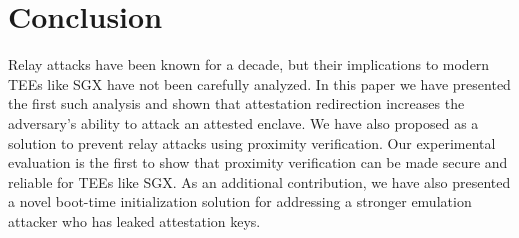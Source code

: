 
\section{Conclusion}
\label{sec:conclusion}

Relay attacks have been known for a decade, but their implications to modern TEEs like SGX have not been carefully analyzed. In this paper we have presented the first such analysis and shown that attestation redirection increases the adversary's ability to attack an attested enclave. We have also proposed \name as a solution to prevent relay attacks using proximity verification. Our experimental evaluation is the first to show that proximity verification can be made secure and reliable for TEEs like SGX. As an additional contribution, we have also presented a novel boot-time initialization solution for addressing a stronger emulation attacker who has leaked attestation keys.